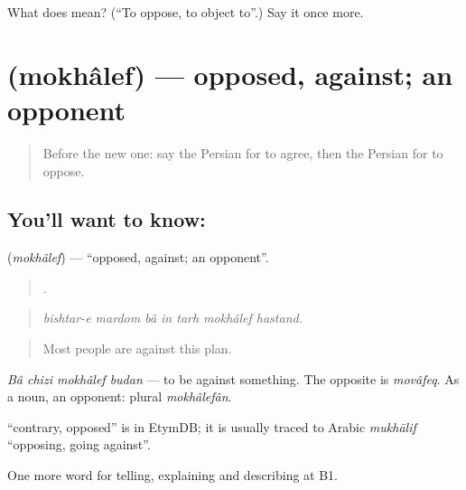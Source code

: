 \begin{tcolorbox}[breakable,colback=teal!4,colframe=teal!35!black,title={Before you move on}]
What does   mean? (\textquotedblleft{}To oppose, to object to\textquotedblright{}.) Say it once more.
\end{tcolorbox}
\section[\texorpdfstring{\fa{مخالف} (mokhâlef)}{مخالف (mokhâlef)}]{ (mokhâlef) — opposed, against; an opponent}

\label{lesson:FA-C361-mokhalef}



\begin{quote}
Before the new one: say the Persian for to agree, then the Persian for to oppose.
\end{quote}

\subsection*{You'll want to know: }
\textbf{} (\emph{mokhâlef}) — \textquotedblleft{}opposed, against; an opponent\textquotedblright{}.

\begin{quote}
      .
\end{quote}

\begin{quote}
\emph{bishtar-e mardom bâ in tarh mokhâlef hastand.}
\end{quote}

\begin{quote}
Most people are against this plan.
\end{quote}

\emph{Bâ chizi mokhâlef budan} — to be against something. The opposite is \emph{movâfeq}. As a noun, an opponent: plural \emph{mokhâlefân}.

\begin{cousinweb}
\textbf{} \textquotedblleft{}contrary, opposed\textquotedblright{} is in EtymDB; it is usually traced to Arabic \emph{mukhālif} \textquotedblleft{}opposing, going against\textquotedblright{}.
\end{cousinweb}

\begin{grammarlens}[title={What you've built}]
One more word for telling, explaining and describing at B1.
\end{grammarlens}

